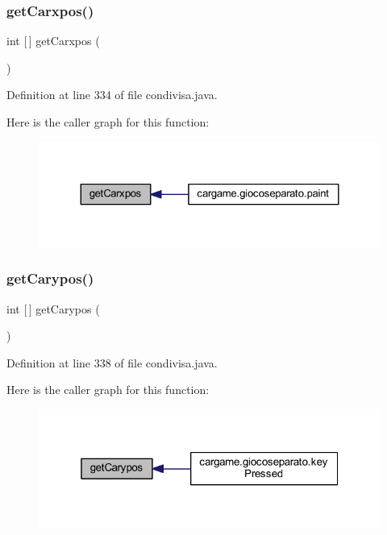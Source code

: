 \subsubsection{\texorpdfstring{get\+Carxpos()}{getCarxpos()}}
{\footnotesize\ttfamily int \mbox{[}$\,$\mbox{]} get\+Carxpos (\begin{DoxyParamCaption}{ }\end{DoxyParamCaption})}



Definition at line 334 of file condivisa.\+java.

Here is the caller graph for this function\+:
\nopagebreak
\begin{figure}[H]
\begin{center}
\leavevmode
\includegraphics[width=324pt]{classcargame_1_1condivisa_a1a0fa95c76119cc26dfcbba5c30066fa_icgraph}
\end{center}
\end{figure}
\mbox{\label{classcargame_1_1condivisa_a0a5a97aaafcb53566afc1767134f4bca}} 
\subsubsection{\texorpdfstring{get\+Carypos()}{getCarypos()}}
{\footnotesize\ttfamily int \mbox{[}$\,$\mbox{]} get\+Carypos (\begin{DoxyParamCaption}{ }\end{DoxyParamCaption})}



Definition at line 338 of file condivisa.\+java.

Here is the caller graph for this function\+:
\nopagebreak
\begin{figure}[H]
\begin{center}
\leavevmode
\includegraphics[width=319pt]{classcargame_1_1condivisa_a0a5a97aaafcb53566afc1767134f4bca_icgraph}
\end{center}
\end{figure}
\mbox{\label{classcargame_1_1condivisa_a27fca0bd2f18175eab0edbca75a34788}} 
